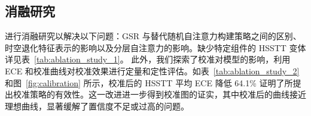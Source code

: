 \documentclass[UTF8,journal,twoside,web]{ieeecolor}
\begin{document}
\subsection{消融研究}\label{subsec:ablation_study}

进行消融研究以解决以下问题：GSR 与替代随机自注意力构建策略之间的区别、时空退化特征表示的影响以及分层自注意力的影响。缺少特定组件的 HSSTT 变体详见表~\ref{tab:ablation_study_1}。
此外，我们探索了校准对模型的影响，利用 ECE 和校准曲线对校准效果进行定量和定性评估。如表~\ref{tab:ablation_study_2} 和图~\ref{fig:calibration} 所示，校准后的 HSSTT 平均 ECE 降低 64.1\% 证明了所提出校准策略的有效性。这一改进进一步得到校准图的证实，其中校准后的曲线接近理想曲线，显著缓解了置信度不足或过高的问题。
\end{document}
